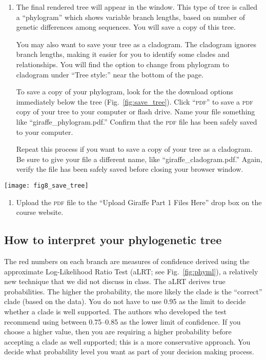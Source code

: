 \documentclass[11pt, addpoints]{exam}
\begin{document}
\begin{enumerate}
\item
  The final rendered tree will appear in the window. This type of tree is called
  a “phylogram” which shows variable branch lengths, based on number of 
  genetic differences among sequences. You will save a copy of this tree.
  
  You may also want to save your tree as a cladogram. The cladogram ignores
  branch lengths, making it easier for you to identify some clades and relationships.
  You will find the option to change from phylogram to cladogram under “Tree style:”
  near the bottom of the page.
  
  To save a copy of your phylogram, look for the the download options immediately 
  below the tree (Fig.~\ref{fig:save_tree}). Click “\textsc{pdf}” to
  save a \textsc{pdf} copy of your tree to your computer or flash drive. Name your file something
  like “giraffe\_phylogram.pdf.” Confirm that the \textsc{pdf} file has been safely saved to your 
  computer.
  
  Repeat this process if you want to save a copy of your tree as a cladogram. Be sure to
  give your file a different name, like “giraffe\_cladogram.pdf.” Again, verify the file has
  been safely saved before closing your browser window.
  
\end{enumerate}

\begin{center}
	\texttt{[image: fig8\_save\_tree]}
\end{center}

\begin{enumerate}
\item
  Upload the \textsc{pdf} file to the ``Upload Giraffe Part 1 Files Here'' drop
  box on the course website.
\end{enumerate}

\subsection*{How to interpret your phylogenetic tree}

The red numbers on each branch are measures of confidence derived using
the approximate Log-Likelihood Ratio Test (aLRT; see Fig.~\ref{fig:phyml}), a relatively new
technique that we did not discuss in class. The aLRT derives true probabilities. The higher the
probability, the more likely the clade is the “correct” clade (based
on the data). You do not have to use 0.95 as the limit to decide whether
a clade is well supported. The authors who developed the test recommend
using between 0.75--0.85 as the lower limit of confidence. If you choose
a higher value, then you are requiring a higher probability before
accepting a clade as well supported; this is a more conservative
approach. You decide what probability level you want as part of your
decision making process.
\end{document}
